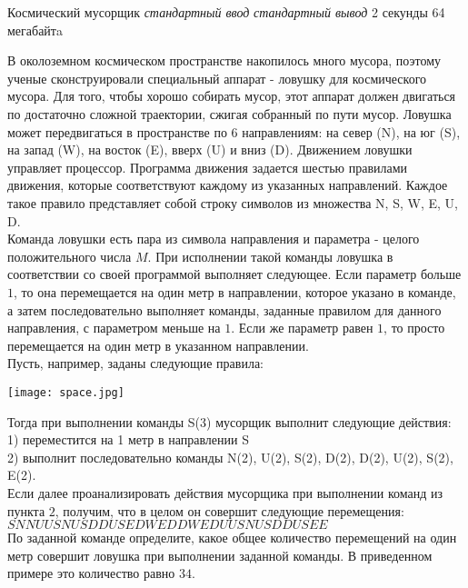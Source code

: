 \graphicspath{ {./images/} }
\begin{problem}%
{Космический мусорщик}%
{\textsl{стандартный ввод}}%
{\textsl{стандартный вывод}}%
{2 секунды}%
{64 мегабайтa}{}

В околоземном космическом пространстве накопилось много мусора, поэтому ученые сконструировали специальный аппарат - ловушку для космического мусора. Для того, чтобы хорошо собирать мусор, этот аппарат должен двигаться по достаточно сложной траектории, сжигая собранный по пути мусор. Ловушка может передвигаться в пространстве по 6 направлениям: на север (N), на юг (S), на запад (W), на восток (E), вверх (U) и вниз (D). Движением ловушки управляет процессор. Программа движения задается шестью правилами движения, которые соответствуют каждому из указанных направлений. Каждое такое правило представляет собой строку символов из множества {N, S, W, E, U, D}. \\ 

Команда ловушки есть пара из символа направления и параметра - целого положительного числа $M$. При исполнении такой команды ловушка в соответствии со своей программой выполняет следующее. Если параметр больше $1$, то она перемещается на один метр в направлении, которое указано в команде, а затем последовательно выполняет команды, заданные правилом для данного направления, с параметром меньше на $1$. Если же параметр равен $1$, то просто перемещается на один метр в указанном направлении. \\

Пусть, например, заданы следующие правила:

\begin{center}
\texttt{[image: space.jpg]}
\end{center}

Тогда при выполнении команды S(3) мусорщик выполнит следующие действия: \\ 

1) переместится на 1 метр в направлении S \\
2) выполнит последовательно команды N(2), U(2), S(2), D(2), D(2), U(2), S(2), E(2). \\

Если далее проанализировать действия мусорщика при выполнении команд из пункта $2$, получим, что в целом он совершит следующие перемещения: \\

$SNNUUSNUSDDUSEDWEDDWEDUUSNUSDDUSEE$ \\

По заданной команде определите, какое общее количество перемещений на один метр совершит ловушка при выполнении заданной команды. В приведенном примере это количество равно $34$.


\end{problem}
